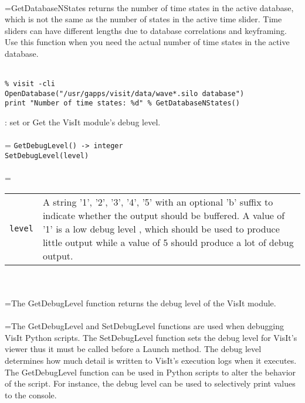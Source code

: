 \documentclass[10pt,a4paper]{report}
\begin{document}
 \\ 
\hangindent=\parindent GetDatabaseNStates returns the number of time states in the active database, which is not the same as the number of states in the active time slider. Time sliders can have different lengths due to database correlations and keyframing. Use this function when you need the actual number of time states in the active database. \\[-3mm] 

\\[-6mm]
\begin{verbatim}% visit -cli
OpenDatabase("/usr/gapps/visit/data/wave*.silo database")
print "Number of time states: %d" % GetDatabaseNStates()
\end{verbatim}
\newpage


{}
: set or Get the VisIt module's debug level.\\[-3mm]

 \\ 
\hangindent=\parindent 
\verb!GetDebugLevel() -> integer!\\ 
\verb!SetDebugLevel(level)!\\ [-3mm]

 \\ 
\hangindent=\parindent 
\begin{tabular}{lp{9cm}}
\verb!level! & A string '1', '2', '3', '4', '5' with an optional 'b' suffix to indicate whether the output should be buffered. A value of '1' is a low debug level , which should be used to produce little output while a value of 5 should  produce a lot of debug output. \\
\end{tabular} \\[-2mm]


 \\ 
\hangindent=\parindent The GetDebugLevel function returns the debug level of the VisIt module. \\[-3mm] 

 \\ 
\hangindent=\parindent The GetDebugLevel and SetDebugLevel functions are used when debugging VisIt Python scripts. The SetDebugLevel function sets the debug level for VisIt's viewer thus it must be called before a Launch method. The debug level determines how much detail is written to VisIt's execution logs when it executes. The GetDebugLevel function can be used in Python scripts to alter the behavior of the script. For instance, the debug level can be used to selectively print values to the console. \\[-3mm] 
\end{document}
